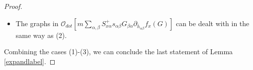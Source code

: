 \documentclass{article}
\newcommand{\1}{\mathds{1}}
\numberwithin{equation}{section}
\newcommand{\al}{\alpha}
\newcommand{\be}{\begin{equation}}
\newcommand{\ee}{\end{equation}}
\renewcommand{\cal}{\mathcal}
\renewcommand{\geq}{\geqslant}
\renewcommand{\ge}{\geq}
\theoremstyle{plain} %
\theoremstyle{remark}
\begin{document}
\begin{proof}
\begin{itemize}
\begin{itemize}
\item If $\al$ is not identified with any other atom, then $G_{\al x}$ is of scaling order 1. Moreover, suppose $\cal G_1$ contains a graph in $\partial_{\overline h_{x\al}} f_x(G)$ obtained by taking partial derivative as in \eqref{partialhG}. If $b \ne x$, or if $a=b=x$, then the scaling order of $G_{a\al}G_{xb}$ or $\overline G_{bx}\overline G_{\al a}$ is strictly larger than the original component $G_{ab}$ or $\overline G_{ba}$. Hence we have \eqref{larger weight} and $\cal G_1$ satisfies (i).
 



\item Suppose $\al$ is not identified with any other atom, and $\cal G_1$ contains a graph in $\partial_{\overline h_{x\al}} f_x(G)$ obtained by taking partial derivative as in \eqref{partialhG}. If $b=x$ and $a\ne x$, then ${\cal O}^{(1)}_{weight}(x) $ will expand them as
\be\nonumber
G_{a\al}G_{xx} =m G_{a\al}+G_{a\al}(G_{xx}-m) , \quad  \text{or} \quad \overline G_{xx}\overline G_{\al a}=\overline m\overline G_{\al a} +(\overline G_{xx}-\overline m)\overline G_{\al a}.\ee
If $\cal G_1$ contains $G_{a\al}(G_{xx}-m) $ or $(\overline G_{xx}-\overline m)\overline G_{\al a}$, then we have \eqref{larger weight} and $\cal G_1$ satisfies (i). Otherwise, if $\cal G_1$ contains $m G_{a\al}$ or $\overline m\overline G_{\al a}$, then $\cal G_1$ satisfies (ii). 

\end{itemize}
\item[(3)] The graphs in $\cal O_{dot}\left[m \sum_{\al,\beta} S^{+}_{x\al}s_{\al \beta} G_{\beta \al}\partial_{\overline h_{\al \beta}} f_x(G)\right]$ can be dealt with in the same way as (2).

 
\end{itemize}
Combining the cases (1)-(3), we can conclude the last statement of Lemma \ref{expandlabel}.
  \end{proof} 
\end{document}
